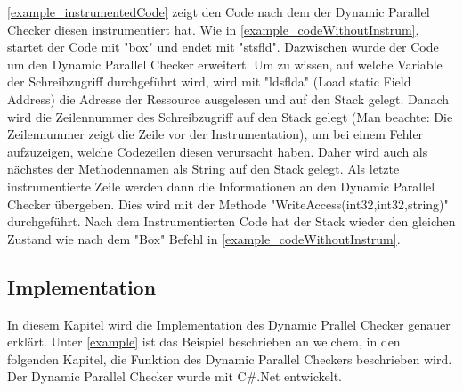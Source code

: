 \documentclass[10pt,a4paper]{article}
\begin{document}
\begin{flushleft}
\begin{figure}[H]
\end{figure}
\autoref{example_instrumentedCode} zeigt den Code nach dem der Dynamic Parallel Checker diesen instrumentiert hat. Wie in \autoref{example_codeWithoutInstrum}, startet der Code mit "box" und endet mit "stsfld". Dazwischen wurde der Code um den Dynamic Parallel Checker erweitert. Um zu wissen, auf welche Variable der Schreibzugriff durchgeführt wird, wird mit "ldsflda" (Load static Field Address) die Adresse der Ressource ausgelesen und auf den Stack gelegt. Danach wird die Zeilennummer des Schreibzugriff auf den Stack gelegt (Man beachte: Die Zeilennummer zeigt die Zeile vor der Instrumentation), um bei einem Fehler aufzuzeigen, welche Codezeilen diesen verursacht haben. Daher wird auch als nächstes der Methodennamen als String auf den Stack gelegt. Als letzte instrumentierte Zeile werden dann die Informationen an den Dynamic Parallel Checker übergeben. Dies wird mit der Methode "WriteAccess(int32,int32,string)" durchgeführt. Nach dem Instrumentierten Code hat der Stack wieder den gleichen Zustand wie nach dem "Box" Befehl in \autoref{example_codeWithoutInstrum}.
\end{flushleft}
\subsection{Implementation}\label{implementation}
In diesem Kapitel wird die Implementation des Dynamic Prallel Checker genauer erklärt. Unter \ref{example} ist das Beispiel beschrieben an welchem, in den folgenden Kapitel, die Funktion des Dynamic Parallel Checkers beschrieben wird. Der Dynamic Parallel Checker wurde mit C\#.Net entwickelt.
\newpage
\end{document}
